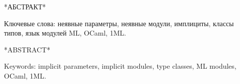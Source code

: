 \documentclass[../diploma.tex]{subfiles}
\begin{document}
*АБСТРАКТ*

\vspace*{\fill}

Ключевые слова: неявные параметры, неявные модули, имплициты, классы типов, язык модулей ML, OCaml, 1ML. 

\newpage

*ABSTRACT*

\vspace*{\fill}

Keywords: implicit parameters, implicit modules, type classes, ML modules, OCaml, 1ML.
\end{document}
